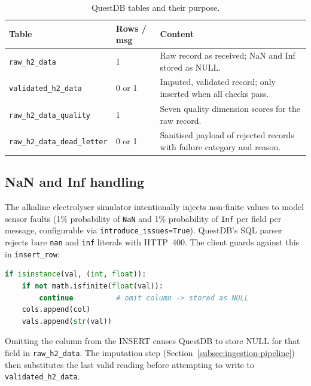 \begin{table}[H]
  \centering
  \caption{QuestDB tables and their purpose.}
  \label{tab:tables}
  \begin{tabularx}{\textwidth}{llX}
    \toprule
    \textbf{Table} & \textbf{Rows / msg} & \textbf{Content} \\
    \midrule
    \texttt{raw\_h2\_data}
      & 1
      & Raw record as received; NaN and Inf stored as NULL. \\
    \texttt{validated\_h2\_data}
      & 0 or 1
      & Imputed, validated record; only inserted when all checks pass. \\
    \texttt{raw\_h2\_data\_quality}
      & 1
      & Seven quality dimension scores for the raw record. \\
    \texttt{raw\_h2\_data\_dead\_letter}
      & 0 or 1
      & Sanitised payload of rejected records with failure category and reason. \\
    \bottomrule
  \end{tabularx}
\end{table}

\subsection{NaN and Inf handling}
\label{subsec:nan-handling}

The alkaline electrolyser simulator intentionally injects non-finite values
to model sensor faults (1\% probability of \texttt{NaN} and 1\% probability
of \texttt{Inf} per field per message, configurable via
\texttt{introduce\_issues=True}).
QuestDB's SQL parser rejects bare \texttt{nan} and \texttt{inf} literals
with HTTP~400.
The client guards against this in \texttt{insert\_row}:

\begin{lstlisting}[language=Python,
    caption={NaN/Inf guard in QuestDBClient.insert\_row.},
    label={lst:nan-guard}]
if isinstance(val, (int, float)):
    if not math.isfinite(float(val)):
        continue          # omit column -> stored as NULL
    cols.append(col)
    vals.append(str(val))
\end{lstlisting}

Omitting the column from the INSERT causes QuestDB to store NULL for that
field in \texttt{raw\_h2\_data}.
The imputation step (Section~\ref{subsec:ingestion-pipeline}) then
substitutes the last valid reading before attempting to write to
\texttt{validated\_h2\_data}.

